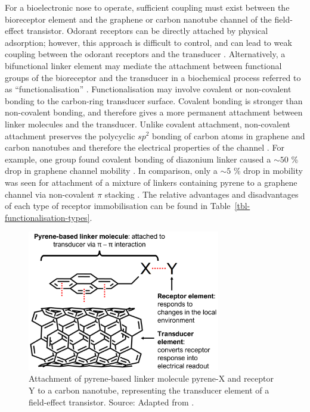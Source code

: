 \documentclass[
  a4paper,
]{scrbook}
\begin{document}
For a bioelectronic nose to operate, sufficient coupling must exist
between the bioreceptor element and the graphene or carbon nanotube
channel of the field-effect transistor. Odorant receptors can be
directly attached by physical adsorption; however, this approach is
difficult to control, and can lead to weak coupling between the odorant
receptors and the transducer \autocite{Kwon2015,Dung2018,Bohbot2020}.
Alternatively, a bifunctional linker element may mediate the attachment
between functional groups of the bioreceptor and the transducer in a
biochemical process referred to as ``functionalisation''
\autocite{Star2003a}. Functionalisation may involve covalent or
non-covalent bonding to the carbon-ring transducer surface. Covalent
bonding is stronger than non-covalent bonding, and therefore gives a
more permanent attachment between linker molecules and the transducer.
Unlike covalent attachment, non-covalent attachment preserves the
polycyclic \(sp^2\) bonding of carbon atoms in graphene and carbon
nanotubes and therefore the electrical properties of the channel
\autocite{DiCrescenzo2014,Yao2021,Shkodra2021,Li2023}. For example, one
group found covalent bonding of diazonium linker caused a \(\sim 50\) \%
drop in graphene channel mobility \autocite{Lerner2014}. In comparison,
only a \(\sim 5\) \% drop in mobility was seen for attachment of a
mixture of linkers containing pyrene to a graphene channel via
non-covalent \(\pi\) stacking \autocite{Thodkar2021}. The relative
advantages and disadvantages of each type of receptor immobilisation can
be found in Table~\ref{tbl-functionalisation-types}.

\begin{figure}

{\centering \includegraphics[width=0.75\textwidth,height=\textheight]{figures/ch3/pyrene-cnt.png}

}

\caption{\label{fig-pi-interaction-cnt}Attachment of pyrene-based linker
molecule pyrene-X and receptor Y to a carbon nanotube, representing the
transducer element of a field-effect transistor. Source: Adapted from
\autocite{Carbonnanotube}.}

\end{figure}
\end{document}
